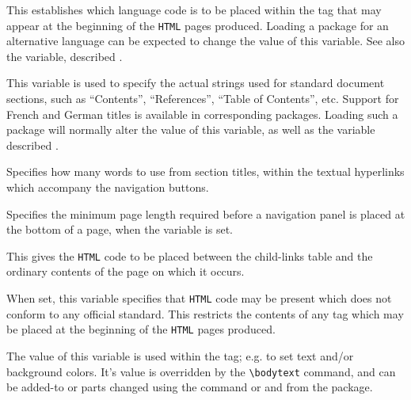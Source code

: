 \begin{htmllist}%
%
\item [\fn{\$default\_language}\texttt{ = 'english';}\label{isolanguage}]
This establishes which language code is to be placed within
the  tag that may appear at the beginning
of the \texttt{HTML} pages produced. Loading a package for
an alternative language can be expected to change the value of this variable.\html{\\}
See also the  variable, described .


\item [\fn{\$TITLES\_LANGUAGE}\texttt{ = 'english';}\label{doclanguage}]
This variable is used to specify the actual strings used for standard document
sections, such as ``Contents'', ``References'', ``Table of Contents'', etc.\html{\\}
Support for French and German titles is available in corresponding packages.
Loading such a package will normally alter the value of this variable, as well as
the  variable described .


\item [\fn{\$WORDS\_IN\_NAVIGATION\_PANEL\_TITLES}\texttt{ = 4;}]
Specifies how many words to use from section titles,
within the textual hyperlinks which accompany the navigation buttons.


\item [\fn{\$WORDS\_IN\_PAGE}\texttt{ = 450;}]
Specifies the minimum page length required before a navigation panel
is placed at the bottom of a page,
when the  variable is set.


\item [\fn{\$CHILDLINE}\texttt{ = \char34<BR><HR>\char92n\char34;}]
This gives the \texttt{HTML} code to be placed between the child-links
table and the ordinary contents of the page on which it occurs.


\item [\fn{\$NETSCAPE\_HTML}\texttt{ = 0;}]
When set, this variable specifies that \texttt{HTML} code may be present which
does not conform to any official standard.
This restricts the contents of any  tag which may be placed
at the beginning of the \texttt{HTML} pages produced.


\item [\fn{\$BODYTEXT}\texttt{ = '';}]
The value of this variable is used within the  tag;
e.g. to set text and/or background colors.\html{\\}
It's value is overridden by the \verb|\bodytext| command,
and can be added-to or parts changed using the  command
or  and  from the  package.



\end{htmllist}
